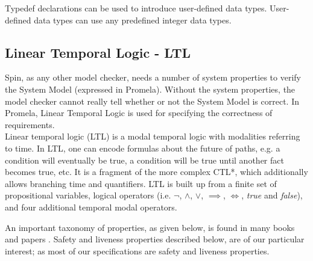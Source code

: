 Typedef declarations can be used to introduce user-defined data types. User-defined data types can use any predefined integer data types. 

\subsection{Linear Temporal Logic - LTL}
\noindent
Spin, as any other model checker, needs a number of system properties to verify the System Model (expressed in Promela). Without the system properties, the model checker cannot really tell whether or not the System Model is correct. In Promela, Linear Temporal Logic is used for specifying the correctness of requirements. \\

Linear temporal logic (LTL) is a modal temporal logic with modalities referring to time. In LTL, one can encode formulas about the future of paths, e.g. a condition will eventually be true, a condition will be true until another fact becomes true, etc. It is a fragment of the more complex CTL*, which additionally allows branching time and quantifiers. 
\clearpage
LTL is built up from a finite set of propositional variables, logical operators (i.e. $\neg$, $\land$, $\lor$, $\implies$, $\iff$, \emph{true} and \emph{false}), and four additional temporal modal operators.

\begin{table}[H]
\begin{center}
\end{center}
\caption{Semantics for the temporal operators}
\label{tem_operators}
\end{table}

An important taxonomy of properties, as given below, is found in many books and papers \cite{Schneider2004}. Safety and liveness properties described below, are of our particular interest; as most of our specifications are safety and liveness properties. \\

